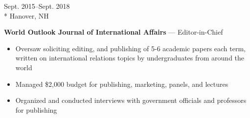 \documentclass[a4paper,9pt]{article}
\begin{document}
\vspace{-3ex}
\begin{minipage}[t]{0.20\linewidth}
	\begin{small}
		\begin{spacing}{1.10}
			\begin{flushright}
				Sept. 2015--Sept. 2018
				\\*
				\vspace*{2.5pt}
				Hanover, NH
			\end{flushright}
		\end{spacing}
	\end{small}
\end{minipage}
\hspace{4mm}
\begin{minipage}[t]{0.75\linewidth}
	\begin{small}
		\begin{spacing}{1.00}
			\begin{flushleft}
				\textbf{World Outlook Journal of International Affairs} --- Editor-in-Chief
                \begin{itemize}[itemsep=0pt,topsep=2.5pt,leftmargin=*]
					\item Oversaw soliciting editing, and publishing of 5-6 academic papers each term, written on international relations
topics by undergraduates from around the world
					\item Managed \$2,000 budget for publishing, marketing, panels, and lectures
                    \item Organized and conducted interviews with government officials and professors for publishing
				\end{itemize}
			\end{flushleft}
		\end{spacing}
	\end{small}
\end{minipage}
\end{document}
